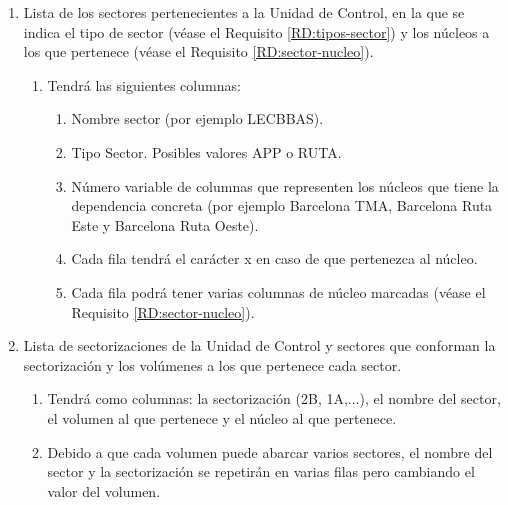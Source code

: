 \begin{enumerate}[label={\textbf{RIO\arabic*}}, ref={Requisito RIO\arabic*},  align=left]
\begin{enumerate}[label*={\textbf{.\arabic*}}]
		\item Lista de los sectores pertenecientes a la Unidad de Control, en la que se indica el tipo de sector (véase el Requisito \ref{RD:tipos-sector}) y los núcleos a los que pertenece (véase el Requisito \ref{RD:sector-nucleo}).
		\begin{enumerate}[label*={\textbf{.\arabic*}}]
			\item Tendrá las siguientes columnas: 
			\begin{enumerate}[label*={\textbf{.\arabic*}}]
				\item Nombre sector (por ejemplo LECBBAS).
				\item Tipo Sector. Posibles valores APP o RUTA.
				\item Número variable de columnas que representen los núcleos que tiene la dependencia concreta (por ejemplo Barcelona TMA, Barcelona Ruta Este y Barcelona Ruta Oeste).
				\item Cada fila tendrá el carácter x en caso de que pertenezca al núcleo.
				\item Cada fila podrá tener varias columnas de núcleo marcadas (véase el Requisito \ref{RD:sector-nucleo}).
			\end{enumerate}
		\end{enumerate}
		\item Lista de sectorizaciones de la Unidad de Control y sectores que conforman la sectorización y los volúmenes a los que pertenece cada sector.
		\begin{enumerate}[label*={\textbf{.\arabic*}}]
			\item Tendrá como columnas: la sectorización (2B, 1A,...), el nombre del sector, el volumen al que pertenece y el núcleo al que pertenece.
			\item Debido a que cada volumen puede abarcar varios sectores, el nombre del sector y la sectorización se repetirán en varias filas pero cambiando el valor del volumen.
		\end{enumerate}
	\end{enumerate}
	

\end{enumerate}
